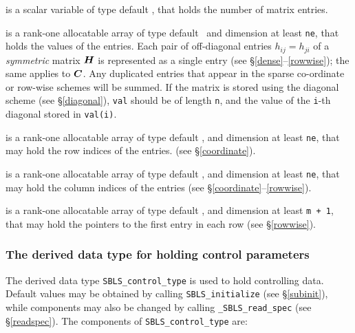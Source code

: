 \documentclass{galahad}
\newcommand{\packagename}{SBLS}
\newcommand{\fullpackagename}{\libraryname\_\packagename}
\begin{document}
\begin{description}
 is a scalar variable of type default \integer, that
holds the number of matrix entries.

 is a rank-one allocatable array of type default \realdp\, 
and dimension at least {\tt ne}, that holds the values of the entries. 
Each pair of off-diagonal entries $h_{ij} = h_{ji}$ of a {\em symmetric}
matrix ${\bm{H}}$ is represented as a single entry 
(see \S\ref{dense}--\ref{rowwise}); the same applies to ${\bm{C}}$.
Any duplicated entries that appear in the sparse 
co-ordinate or row-wise schemes will be summed. 
If the matrix is stored using the diagonal scheme (see \S\ref{diagonal}),
{\tt val} should be of length {\tt n}, and the value of the {\tt i}-th 
diagonal stored in {\tt val(i)}.

 is a rank-one allocatable array of type default \integer, 
and dimension at least {\tt ne}, that may hold the row indices of the entries. 
(see \S\ref{coordinate}).

 is a rank-one allocatable array of type default \integer, 
and dimension at least {\tt ne}, that may hold the column indices of the entries
(see \S\ref{coordinate}--\ref{rowwise}).

 is a rank-one allocatable array of type default \integer, 
and dimension at least {\tt m + 1}, that may hold the pointers to
the first entry in each row (see \S\ref{rowwise}).

\end{description}

\subsubsection{The derived data type for holding control 
 parameters}\label{typecontrol}
The derived data type 
{\tt \packagename\_control\_type} 
is used to hold controlling data. Default values may be obtained by calling 
{\tt \packagename\_initialize}
(see \S\ref{subinit}),
while components may also be changed by calling 
{\tt \fullpackagename\_read\-\_spec}
(see \S\ref{readspec}). 
The components of 
{\tt \packagename\_control\_type} 
are:
\end{document}
